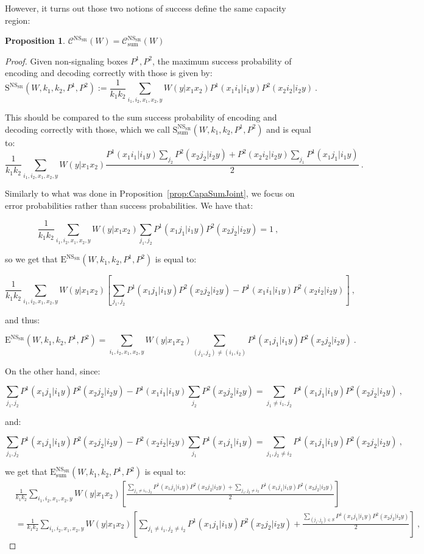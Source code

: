 \documentclass[11pt]{article}
\theoremstyle{definition}
\newtheorem{prop}[theo]{Proposition}
\theoremstyle{remark}
\begin{document}
However, it turns out those two notions of success define the same capacity region:
\begin{prop}
  \label{prop:NSCapaSumJoint}
  $\mathcal{C}^{\mathrm{NS}_{\mathrm{SR}}}(W) = \mathcal{C}_{\text{sum}}^{\mathrm{NS}_{\mathrm{SR}}}(W)$
\end{prop}
\begin{proof}
  Given non-signaling boxes $P^1,P^2$, the maximum success probability of encoding and decoding correctly with those is given by:
\[ \mathrm{S}^{\mathrm{NS}_{\mathrm{SR}}}(W,k_1,k_2,P^1,P^2) := \frac{1}{k_1k_2} \sum_{i_1,i_2,x_1,x_2,y} W(y|x_1x_2)P^1(x_1i_1|i_1y)P^2(x_2i_2|i_2y) \ . \]

This should be compared to the sum success probability of encoding and decoding correctly with those, which we call $\mathrm{S}_{\text{sum}}^{\mathrm{NS}_{\mathrm{SR}}}(W,k_1,k_2,P^1,P^2)$ and is equal to:
\[   \frac{1}{k_1k_2} \sum_{i_1,i_2,x_1,x_2,y} W(y|x_1x_2)\frac{P^1(x_1i_1|i_1y)\sum_{j_2}P^2(x_2j_2|i_2y) + P^2(x_2i_2|i_2y)\sum_{j_1}P^1(x_1j_1|i_1y)}{2} \ . \]

Similarly to what was done in Proposition~\ref{prop:CapaSumJoint}, we focus on error probabilities rather than success probabilities. We have that:

\[ \frac{1}{k_1k_2}\sum_{i_1,i_2,x_1,x_2,y}W(y|x_1x_2)\sum_{j_1,j_2}P^1(x_1j_1|i_1y)P^2(x_2j_2|i_2y) = 1 \ ,\]

so we get that $\mathrm{E}^{\mathrm{NS}_{\mathrm{SR}}}(W,k_1,k_2,P^1,P^2)$ is equal to:

\[\frac{1}{k_1k_2} \sum_{i_1,i_2,x_1,x_2,y} W(y|x_1x_2)\left[\sum_{j_1,j_2}P^1(x_1j_1|i_1y)P^2(x_2j_2|i_2y) - P^1(x_1i_1|i_1y)P^2(x_2i_2|i_2y)\right] \ , \]

and thus:

\[\mathrm{E}^{\mathrm{NS}_{\mathrm{SR}}}(W,k_1,k_2,P^1,P^2) = \sum_{i_1,i_2,x_1,x_2,y} W(y|x_1x_2)\sum_{(j_1,j_2) \not= (i_1,i_2)}P^1(x_1j_1|i_1y)P^2(x_2j_2|i_2y)\ .\]

On the other hand, since:

\[ \sum_{j_1,j_2}P^1(x_1j_1|i_1y)P^2(x_2j_2|i_2y) - P^1(x_1i_1|i_1y)\sum_{j_2}P^2(x_2j_2|i_2y)= \sum_{j_1\not=i_1,j_2}P^1(x_1j_1|i_1y)P^2(x_2j_2|i_2y) \ ,\]

and:

\[ \sum_{j_1,j_2}P^1(x_1j_1|i_1y)P^2(x_2j_2|i_2y) - P^2(x_2i_2|i_2y)\sum_{j_1}P^1(x_1j_1|i_1y)= \sum_{j_1,j_2\not=i_2}P^1(x_1j_1|i_1y)P^2(x_2j_2|i_2y) \ ,\]

we get that $\mathrm{E}_{\text{sum}}^{\mathrm{NS}_{\mathrm{SR}}}(W,k_1,k_2,P^1,P^2)$ is equal to:
\begin{equation}
  \begin{aligned}
    &\frac{1}{k_1k_2}\sum_{i_1,i_2,x_1,x_2,y} W(y|x_1x_2)\left[\frac{\sum_{j_1\not=i_1,j_2}P^1(x_1j_1|i_1y)P^2(x_2j_2|i_2y) + \sum_{j_1,j_2\not=i_2}P^1(x_1j_1|i_1y)P^2(x_2j_2|i_2y)}{2}\right]\\
    &=\frac{1}{k_1k_2}\sum_{i_1,i_2,x_1,x_2,y} W(y|x_1x_2)\left[\sum_{j_1\not=i_1,j_2\not=i_2}P^1(x_1j_1|i_1y)P^2(x_2j_2|i_2y) + \frac{\sum_{(j_1,j_2) \in S}P^1(x_1j_1|i_1y)P^2(x_2j_2|i_2y)}{2}\right]\ ,
  \end{aligned}
\end{equation}


\end{proof}
\end{document}
